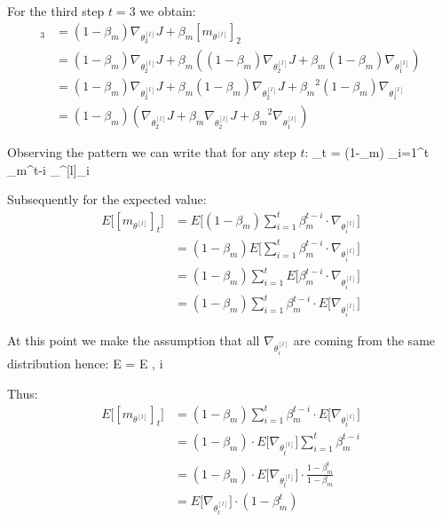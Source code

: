 For the third step $t=3$ we obtain:
\begin{align*}
[m_{\theta^{[l]}}]_3 & = (1 - \beta_m) \nabla_{\theta^{[l]}_3} J + \beta_m [m_{\theta^{[l]}}]_{2} \\
&= (1 - \beta_m) \nabla_{\theta^{[l]}_2} J + \beta_m \left( (1 - \beta_m) \nabla_{\theta^{[l]}_2} J 
+ \beta_m (1 - \beta_m) \nabla_{\theta^{[l]}_1} \right) \\
&= (1 - \beta_m) \nabla_{\theta^{[l]}_2} J + \beta_m (1 - \beta_m) \nabla_{\theta^{[l]}_2} J 
+ {\beta_m}^2 (1 - \beta_m) \nabla_{\theta^{[l]}_1} \\
&= (1 - \beta_m) \left( \nabla_{\theta^{[l]}_2} J + \beta_m \nabla_{\theta^{[l]}_2} J 
+ {\beta_m}^2 \nabla_{\theta^{[l]}_1} \right)
\end{align*}

Observing the pattern we can write that for any step $t$:
\bse
[m_{\theta^{[l]}}]_t = (1-\beta_m) \sum_{i=1}^{t} \beta_m^{t-i} \cdot \nabla_{\theta^{[l]}_i}
\ese

Subsequently for the expected value:
\begin{align*}
E \Big[ [m_{\theta^{[l]}}]_t \Big] &= E \Big[ (1-\beta_m) \sum_{i=1}^{t} \beta_m^{t-i} 
\cdot \nabla_{\theta^{[l]}_i} \Big] \\
&= (1-\beta_m) E \Big[ \sum_{i=1}^{t} \beta_m^{t-i} \cdot \nabla_{\theta^{[l]}_i} \Big] \\
&= (1-\beta_m) \sum_{i=1}^{t} E \Big[ \beta_m^{t-i} \cdot \nabla_{\theta^{[l]}_i} \Big] \\
&= (1-\beta_m) \sum_{i=1}^{t} \beta_m^{t-i} \cdot E \Big[\nabla_{\theta^{[l]}_i} \Big]
\end{align*}

At this point we make the assumption that all $\nabla_{\theta^{[l]}_i}$ are coming from the same distribution hence:
\bse
E  = E , \:\:\: \forall i
\ese

Thus:
\begin{align*}
E \Big[ [m_{\theta^{[l]}}]_t \Big] &= (1-\beta_m) \sum_{i=1}^{t} \beta_m^{t-i} 
\cdot E \Big[\nabla_{\theta^{[l]}_t} \Big] \\
&= (1-\beta_m) \cdot E \Big[\nabla_{\theta^{[l]}_t} \Big] \sum_{i=1}^{t} \beta_m^{t-i} \\
&= (1-\beta_m) \cdot E \Big[\nabla_{\theta^{[l]}_t} \Big] \cdot \frac{1-\beta_m^t}{1 - \beta_m} \\
&= E \Big[\nabla_{\theta^{[l]}_t} \Big] \cdot(1-\beta_m^t)
\end{align*}

